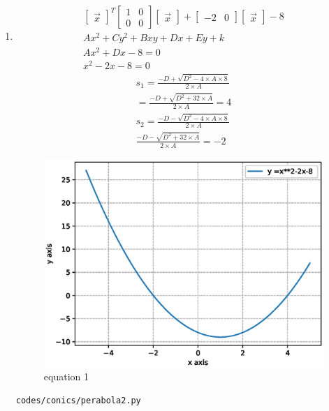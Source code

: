 \begin{enumerate}[label=\arabic*.,ref=\thesubsection.\theenumi]
\item
\begin{align}
\begin{bmatrix}\vec x\end{bmatrix}^T\begin{bmatrix}1 & 0\\0 & 0\end{bmatrix}\begin{bmatrix}\vec x\end{bmatrix} + \begin{bmatrix}-2 & 0\end{bmatrix}\begin{bmatrix}\vec x\end{bmatrix} -8
\\
Ax^2+Cy^2+Bxy+Dx+Ey+k
\\
Ax^2+Dx-8 = 0
\\
x^2-2x-8 = 0
\end{align}
\begin{align}
s_1 =  \frac{-D + \sqrt{D^2 - 4\times A\times 8 }}{2\times A}
\\
=  \frac{-D + \sqrt{D^2 + 32\times A }}{2\times A} = 4 
\\
s_2 =  \frac{-D - \sqrt{D^2 - 4\times A\times 8 }}{2\times A}
\\
\frac{-D - \sqrt{D^2 + 32\times A }}{2\times A} = -2
\end{align}
\begin{figure}[!ht]
	\centering
	\includegraphics[width=\columnwidth]{./figures/conics/perabola1.eps}
	\caption{equation 1 }
	\label{fig:perabola1}
\end{figure}
\begin{lstlisting}
codes/conics/perabola2.py
\end{lstlisting}



\end{enumerate}
